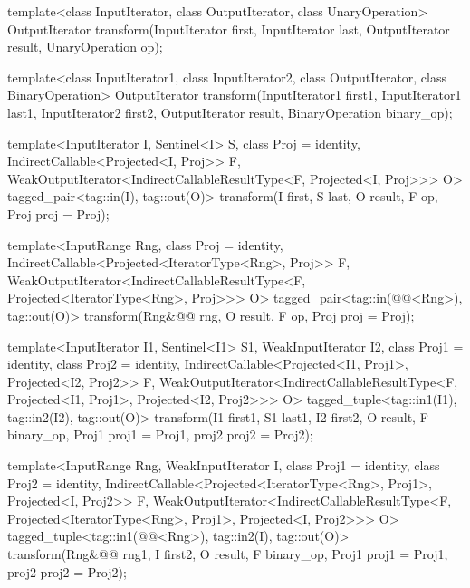 %
\begin{removedblock}
\begin{itemdecl}
template<class InputIterator, class OutputIterator,
         class UnaryOperation>
  OutputIterator
    transform(InputIterator first, InputIterator last,
              OutputIterator result, UnaryOperation op);

template<class InputIterator1, class InputIterator2,
         class OutputIterator, class BinaryOperation>
  OutputIterator
    transform(InputIterator1 first1, InputIterator1 last1,
              InputIterator2 first2, OutputIterator result,
              BinaryOperation binary_op);
\end{itemdecl}
\end{removedblock}
\begin{addedblock}
\begin{itemdecl}
template<InputIterator I, Sentinel<I> S, class Proj = identity,
    IndirectCallable<Projected<I, Proj>> F,
    WeakOutputIterator<IndirectCallableResultType<F, Projected<I, Proj>>> O>
  tagged_pair<tag::in(I), tag::out(O)>
    transform(I first, S last, O result, F op, Proj proj = Proj{});

template<InputRange Rng, class Proj = identity,
    IndirectCallable<Projected<IteratorType<Rng>, Proj>> F,
    WeakOutputIterator<IndirectCallableResultType<F,
      Projected<IteratorType<Rng>, Proj>>> O>
  tagged_pair<tag::in(@@<Rng>), tag::out(O)>
    transform(Rng&@\newtxt{\&}@ rng, O result, F op, Proj proj = Proj{});

template<InputIterator I1, Sentinel<I1> S1, WeakInputIterator I2,
    class Proj1 = identity, class Proj2 = identity,
    IndirectCallable<Projected<I1, Proj1>, Projected<I2, Proj2>> F,
    WeakOutputIterator<IndirectCallableResultType<F, Projected<I1, Proj1>,
      Projected<I2, Proj2>>> O>
  tagged_tuple<tag::in1(I1), tag::in2(I2), tag::out(O)>
    transform(I1 first1, S1 last1, I2 first2, O result,
              F binary_op, Proj1 proj1 = Proj1{}, proj2 proj2 = Proj2{});

template<InputRange Rng, WeakInputIterator I,
    class Proj1 = identity, class Proj2 = identity,
    IndirectCallable<Projected<IteratorType<Rng>, Proj1>, Projected<I, Proj2>> F,
    WeakOutputIterator<IndirectCallableResultType<F,
      Projected<IteratorType<Rng>, Proj1>, Projected<I, Proj2>>> O>
  tagged_tuple<tag::in1(@@<Rng>), tag::in2(I), tag::out(O)>
    transform(Rng&@\newtxt{\&}@ rng1, I first2, O result,
              F binary_op, Proj1 proj1 = Proj1{}, proj2 proj2 = Proj2{});


\end{itemdecl}
\end{addedblock}
